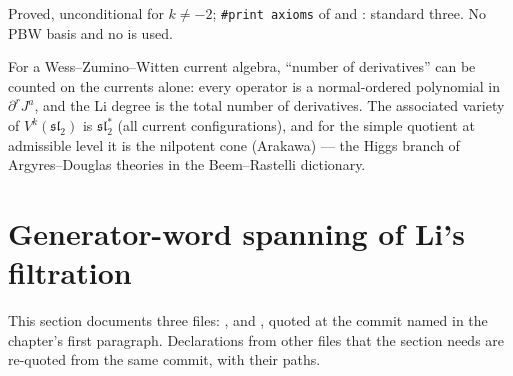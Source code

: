\begin{status}
Proved, unconditional for $k\neq-2$; \texttt{\#print axioms} of \allowbreak{}\allowbreak{}\allowbreak{}\allowbreak{}\allowbreak{}
and \allowbreak{}\allowbreak{}: standard three. No PBW basis and no  is used.
\end{status}

\begin{physics}
For a Wess--Zumino--Witten current algebra, ``number of derivatives'' can be counted on the currents alone: every
operator is a normal-ordered polynomial in $\partial^rJ^a$, and the Li degree is the total number of
derivatives. The associated variety of $V^k(\mathfrak{sl}_2)$ is $\mathfrak{sl}_2^*$ (all current
configurations), and for the simple quotient at admissible level it is the nilpotent cone (Arakawa) --- the Higgs
branch of Argyres--Douglas theories in the Beem--Rastelli dictionary.
\end{physics}


\section{Generator-word spanning of Li's filtration}\label{l11:sec:genwords}

This section documents three files:
,
 and
, quoted at the commit named in
the chapter's first paragraph. Declarations from other files that the section needs are re-quoted from the same
commit, with their paths.

